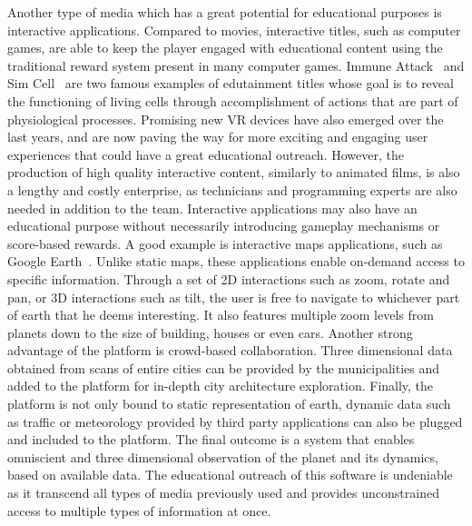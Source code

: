 Another type of media which has a great potential for educational purposes is interactive applications.
Compared to movies, interactive titles, such as computer games, are able to keep the player engaged with educational content using the traditional reward system present in many computer games.
Immune Attack~\cite{immune2008} and Sim Cell~\cite{simcell2013} are two famous examples of edutainment titles whose goal is to reveal the functioning of living cells through accomplishment of actions that are part of physiological processes.
Promising new VR devices have also emerged over the last years, and are now paving the way for more exciting and engaging user experiences that could have a great educational outreach.
However, the production of high quality interactive content, similarly to animated films, is also a lengthy and costly enterprise, as technicians and programming experts are also needed in addition to the team.
Interactive applications may also have an educational purpose without necessarily introducing gameplay mechanisms or score-based rewards. 
A good example is interactive maps applications, such as Google Earth~\cite{gearth2001}.
Unlike static maps, these applications enable on-demand access to specific information.
Through a set of 2D interactions such as zoom, rotate and pan, or 3D interactions such as tilt, the user is free to navigate to whichever part of earth that he deems interesting.
It also features multiple zoom levels from planets down to the size of building, houses or even cars.
Another strong advantage of the platform is crowd-based collaboration.
Three dimensional data obtained from scans of entire cities can be provided by the municipalities and added to the platform for in-depth city architecture exploration.
Finally, the platform is not only bound to static representation of earth, dynamic data such as traffic or meteorology provided by third party applications can also be plugged and included to the platform.
The final outcome is a system that enables omniscient and three dimensional observation of the planet and its dynamics, based on available data.
The educational outreach of this software is undeniable as it transcend all types of media previously used and provides unconstrained access to multiple types of information at once. 

